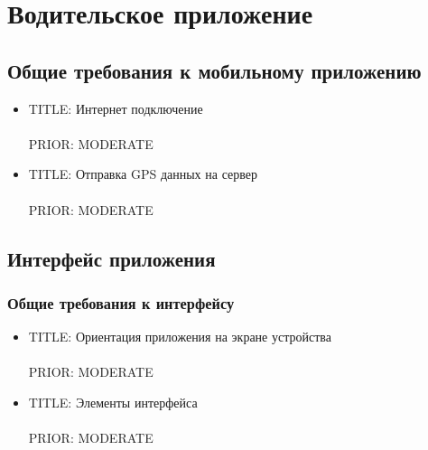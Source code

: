 \section{Водительское приложение}

  \subsection{Общие требования к мобильному приложению}

    \begin{itemize}

      \item{
        TITLE: Интернет подключение\\
        \\
        PRIOR: MODERATE\\}

      \item{
        TITLE: Отправка GPS данных на сервер\\
        \\
        PRIOR: MODERATE\\}

    \end{itemize}

  \subsection{Интерфейс приложения}
   
    \subsubsection{Общие требования к интерфейсу}
      \begin{itemize}

        \item{
          TITLE: Ориентация приложения на экране устройства\\
          \\
          PRIOR: MODERATE\\}

        \item{
          TITLE: Элементы интерфейса\\
          \\
          PRIOR: MODERATE\\}

      \end{itemize}

